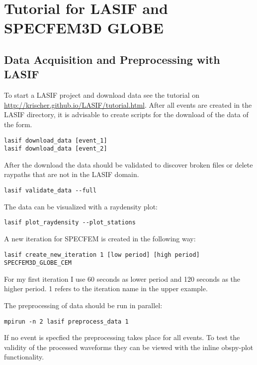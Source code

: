 

\chapter{Tutorial for LASIF and SPECFEM3D GLOBE}

\section{Data Acquisition and Preprocessing with LASIF}
To start a LASIF project and download data see the tutorial on \url{http://krischer.github.io/LASIF/tutorial.html}.
After all events are created in the LASIF directory, it is advisable to create scripts for the download of the data of the form.

\begin{lstlisting}
lasif download_data [event_1]
lasif download_data [event_2]
\end{lstlisting}

After the download the data should be validated to discover broken files or
delete raypaths that are not in the LASIF domain.

\begin{lstlisting} 
lasif validate_data --full
\end{lstlisting}

The data can be visualized with a raydensity plot:
\begin{lstlisting} 
lasif plot_raydensity --plot_stations
\end{lstlisting}

A new iteration for SPECFEM is created in the following way:
\begin{lstlisting} 
lasif create_new_iteration 1 [low period] [high period] SPECFEM3D_GLOBE_CEM
\end{lstlisting}

For my first iteration I use 60 seconds as lower period and 120 seconds as the
higher period. 1 refers to the iteration name in the upper example.

The preprocessing of data should be run in parallel:
\begin{lstlisting} 
mpirun -n 2 lasif preprocess_data 1
\end{lstlisting}

If no event is specfied the preprocessing takes place for all events.
To test the validity of the processed waveforms they can be viewed with
the inline obspy-plot functionality.

